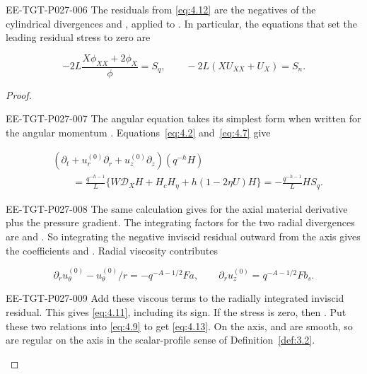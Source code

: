 \begin{proposition}\label{prop:4.2}
\begin{EESegment}{EE-TGT-P027-006}
The residuals  from
\eqref{eq:4.12} are the negatives of the cylindrical divergences
 and
, applied to
. In particular, the equations
that set the leading residual stress to zero are
\end{EESegment}
\begin{equation}
 -2L\frac{X\phi_{XX}+2\phi_X}{\phi}=S_q,
 \qquad
 -2L(XU_{XX}+U_X)=S_n.
\tag{4.13}\label{eq:4.13}
\end{equation}
\end{proposition}

\begin{proof}
\begin{EESegment}{EE-TGT-P027-007}
The angular equation takes its simplest form when written for the angular
momentum .
Equations~\eqref{eq:4.2} and~\eqref{eq:4.7} give
\end{EESegment}
\begin{equation}
\begin{split}
 &(\partial_t+u_r^{(0)}\partial_r+u_z^{(0)}\partial_z)(q^{-h}H)\\
 &\qquad=\frac{q^{-h-1}}{L}
   \{W\mathcal D_XH+H_cH_\eta+h(1-2\eta U)H\}
   =-\frac{q^{-h-1}}{L}HS_q.
\end{split}
\tag{4.14}\label{eq:4.14}
\end{equation}
\begin{EESegment}{EE-TGT-P027-008}
The same calculation gives
 for the axial material derivative plus
the pressure gradient. The integrating factors for the two
radial divergences are  and
. So integrating the negative inviscid residual outward
from the axis gives the coefficients
 and
. Radial viscosity contributes
\end{EESegment}
\[
 \partial_ru_\theta^{(0)}-u_\theta^{(0)}/r=-q^{-A-1/2}Fa,
 \qquad
 \partial_ru_z^{(0)}=q^{-A-1/2}Fb_s.
\]
\begin{EESegment}{EE-TGT-P027-009}
Add these viscous terms to the radially integrated inviscid residual. This
gives \eqref{eq:4.11}, including its sign. If the stress is zero, then
. Put these two relations into
\eqref{eq:4.9} to get \eqref{eq:4.13}. On the axis,
 and
 are smooth, so
 are regular on the axis in the scalar-profile sense
of Definition~\ref{def:3.2}.
\end{EESegment}
\end{proof}

